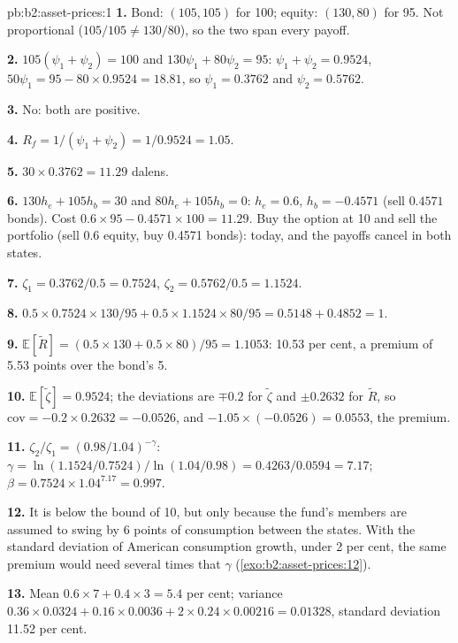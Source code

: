\begin{solution}{pb:b2:asset-prices:1}
\textbf{1.} Bond: $(105, 105)$ for 100; equity: $(130, 80)$ for 95. Not proportional ($105/105 \ne
130/80$), so the two span every payoff.

\textbf{2.} $105(\psi_1 + \psi_2) = 100$ and $130\psi_1 + 80\psi_2 = 95$: $\psi_1 + \psi_2 = 0.9524$, $50\psi_1
= 95 - 80 \times 0.9524 = 18.81$, so $\psi_1 = 0.3762$ and $\psi_2 = 0.5762$.

\textbf{3.} No: both  are positive.

\textbf{4.} $R_f = 1/(\psi_1 + \psi_2) = 1/0.9524 = 1.05$.

\textbf{5.} $30 \times 0.3762 = 11.29$ dalens.

\textbf{6.} $130h_e + 105h_b = 30$ and $80h_e + 105h_b = 0$: $h_e = 0.6$, $h_b = -0.4571$ (sell
$0.4571$ bonds). Cost $0.6 \times 95 - 0.4571 \times 100 = 11.29$. Buy the option at 10 and sell the
portfolio (sell 0.6 equity, buy 0.4571 bonds):  today, and the payoffs cancel in both
states.

\textbf{7.} $\zeta_1 = 0.3762/0.5 = 0.7524$, $\zeta_2 = 0.5762/0.5 = 1.1524$.

\textbf{8.} $0.5 \times 0.7524 \times 130/95 + 0.5 \times 1.1524 \times 80/95 = 0.5148 + 0.4852 = 1$.

\textbf{9.} $\mathbb{E}[\tilde R] = (0.5 \times 130 + 0.5 \times 80)/95 = 1.1053$: 10.53 per cent, a
premium of 5.53 points over the bond's 5.

\textbf{10.} $\mathbb{E}[\tilde\zeta] = 0.9524$; the deviations are $\mp 0.2$ for $\tilde\zeta$ and
$\pm 0.2632$ for $\tilde R$, so $\mathrm{cov} = -0.2 \times 0.2632 = -0.0526$, and $-1.05 \times
(-0.0526) = 0.0553$, the premium.

\textbf{11.} $\zeta_2/\zeta_1 = (0.98/1.04)^{-\gamma}$: $\gamma = \ln(1.1524/0.7524)/\ln(1.04/0.98) =
0.4263/0.0594 = 7.17$; $\beta = 0.7524 \times 1.04^{7.17} = 0.997$.

\textbf{12.} It is below the bound of 10, but only because the fund's members are assumed to swing by
6 points of consumption between the states. With the standard deviation of American consumption growth,
under 2 per cent, the same premium would need several times that $\gamma$
(\cref{exo:b2:asset-prices:12}).

\textbf{13.} Mean $0.6 \times 7 + 0.4 \times 3 = 5.4$ per cent; variance $0.36 \times 0.0324 + 0.16
\times 0.0036 + 2 \times 0.24 \times 0.00216 = 0.01328$, standard deviation 11.52 per cent.


\end{solution}
